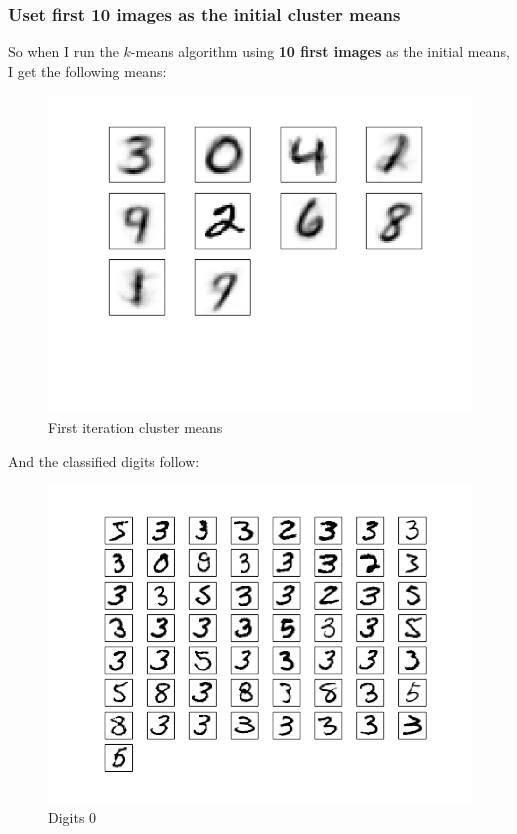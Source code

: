 \documentclass[10pt]{article}
\begin{document}
\subsubsection{Uset first 10 images as the initial cluster means}
So when I run the $k$-means algorithm using \textbf{10 first images} as the initial means, I get the following means:
\begin{figure}
\begin{center}
\includegraphics[scale=0.5]{meansA}
\caption{First iteration cluster means}
\end{center}
\end{figure}
And the classified digits follow:
\begin{figure}
\begin{center}
\includegraphics[scale=0.5]{meansA0}
\caption{Digits 0}
\end{center}
\end{figure}
\end{document}
